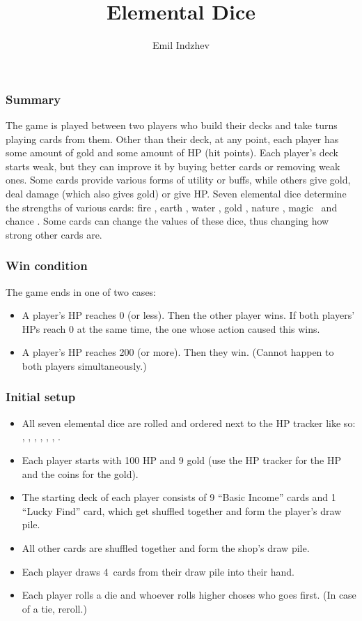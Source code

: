 \documentclass[dvipsnames,parskip,a4paper]{scrartcl}
\title{Elemental Dice}
\author{Emil Indzhev}
\newcommand{\iconsize}{3.4mm}
\newcommand{\icondepth}{0.45mm}
\newcommand{\icon}[1]{\raisebox{-\icondepth}{\texttt{[image:  \#1 ]}}}
\newcommand{\fire}{\icon{icons/fire.png}}
\newcommand{\earth}{\icon{icons/earth.png}}
\newcommand{\water}{\icon{icons/water.png}}
\newcommand{\nature}{\icon{icons/nature.png}}
\newcommand{\magic}{\icon{icons/magic.png}}
\newcommand{\gold}{\icon{icons/gold.png}}
\newcommand{\chance}{\icon{icons/chance.png}}
\newcommand{\handsize}{4}
\begin{document}
\maketitle

\subsubsection*{Summary}

The game is played between two players who build their decks and take turns playing cards from them. Other than their deck, at any point, each player has some amount of gold and some amount of HP (hit points). Each player's deck starts weak, but they can improve it by buying better cards or removing weak ones. Some cards provide various forms of utility or buffs, while others give gold, deal damage (which also gives gold) or give HP. Seven elemental dice determine the strengths of various cards: fire \fire, earth \earth, water \water, gold \gold, nature \nature, magic \magic \ and chance \chance. Some cards can change the values of these dice, thus changing how strong other cards are.

\subsubsection*{Win condition}

The game ends in one of two cases:

\begin{itemize}
\item A player's HP reaches 0 (or less). Then the other player wins. If both players' HPs reach 0 at the same time, the one whose action caused this wins.
\item A player's HP reaches 200 (or more). Then they win. (Cannot happen to both players simultaneously.)
\end{itemize}

\subsubsection*{Initial setup}

\begin{itemize}
\item All seven elemental dice are rolled and ordered next to the HP tracker like so: \fire, \earth, \water, \gold, \nature, \magic, \chance.
\item Each player starts with 100 HP and 9 gold (use the HP tracker for the HP and the coins for the gold).
\item The starting deck of each player consists of 9 ``Basic Income'' cards and 1 ``Lucky Find'' card, which get shuffled together and form the player's draw pile.
\item All other cards are shuffled together and form the shop's draw pile.
\item Each player draws \handsize \ cards from their draw pile into their hand.
\item Each player rolls a die and whoever rolls higher choses who goes first. (In case of a tie, reroll.)
\end{itemize}
\end{document}
